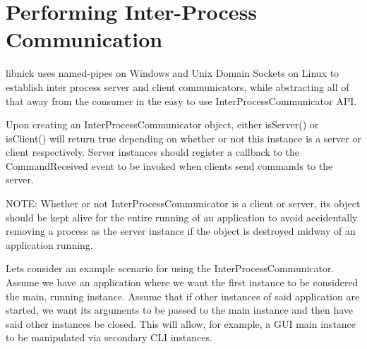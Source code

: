 \chapter{Performing Inter-\/\+Process Communication}
\hypertarget{md_manual_2ipc}{}\label{md_manual_2ipc}
\label{md_manual_2ipc_autotoc_md2}%
%
libnick uses named-\/pipes on Windows and Unix Domain Sockets on Linux to establish inter process server and client communicators, while abstracting all of that away from the consumer in the easy to use {\ttfamily Inter\+Process\+Communicator} API.

Upon creating an {\ttfamily Inter\+Process\+Communicator} object, either {\ttfamily is\+Server()} or {\ttfamily is\+Client()} will return true depending on whether or not this instance is a server or client respectively. Server instances should register a callback to the {\ttfamily Command\+Received} event to be invoked when clients send commands to the server.

NOTE\+: Whether or not {\ttfamily Inter\+Process\+Communicator} is a client or server, its object should be kept alive for the entire running of an application to avoid accidentally removing a process as the server instance if the object is destroyed midway of an application running.

Let\textquotesingle{}s consider an example scenario for using the {\ttfamily Inter\+Process\+Communicator}. Assume we have an application where we want the first instance to be considered the main, running instance. Assume that if other instances of said application are started, we want its arguments to be passed to the main instance and then have said other instances be closed. This will allow, for example, a GUI main instance to be manipulated via secondary CLI instances.

